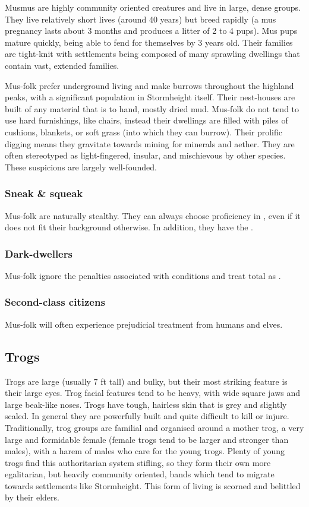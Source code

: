 \documentclass[a4paper,11pt,oneside]{book}
\newcommand{\textlf}[1]{\textbf{\titlecap{#1}}}
\begin{document}
Musmus are highly community oriented creatures and live in large, dense groups. They live relatively short lives (around 40 years) but breed rapidly (a mus pregnancy lasts about 3 months and produces a litter of 2 to 4 pups). Mus pups mature quickly, being able to fend for themselves by 3 years old. Their families are tight-knit with settlements being composed of many sprawling dwellings that contain vast, extended families.

Mus-folk prefer underground living and make burrows throughout the highland peaks, with a significant population in Stormheight itself. Their nest-houses are built of any material that is to hand, mostly dried mud. Mus-folk do not tend to use hard furnishings, like chairs, instead their dwellings are filled with piles of cushions, blankets, or soft grass (into which they can burrow). Their prolific digging means they gravitate towards mining for minerals and aether. They are often stereotyped as light-fingered, insular, and mischievous by other species. These suspicions are largely well-founded.

\subsubsection*{Sneak \& squeak}
Mus-folk are naturally stealthy. They can always choose proficiency in \textlf{stealth}, even if it does not fit their background otherwise. In addition, they have the \textlf{hit and run perk}.

\subsubsection*{Dark-dwellers}
Mus-folk ignore the penalties associated with \textlf{low light} conditions and treat total \textlf{darkness} as \textlf{low light}.

\subsubsection*{Second-class citizens}
Mus-folk will often experience prejudicial treatment from humans and elves. 


\subsection{Trogs}
Trogs are large (usually 7 ft tall) and bulky, but their most striking feature is their large eyes. Trog facial features tend to be heavy, with wide square jaws and large beak-like noses. Trogs have tough, hairless skin that is grey and slightly scaled. In general they are powerfully built and quite difficult to kill or injure.  Traditionally, trog groups are familial and organised around a mother trog, a very large and formidable female (female trogs tend to be larger and stronger than males), with a harem of males who care for the young trogs. Plenty of young trogs find this authoritarian system stifling, so they form their own more egalitarian, but heavily community oriented, bands which tend to migrate towards settlements like Stormheight. This form of living is scorned and belittled by their elders. 
\end{document}

